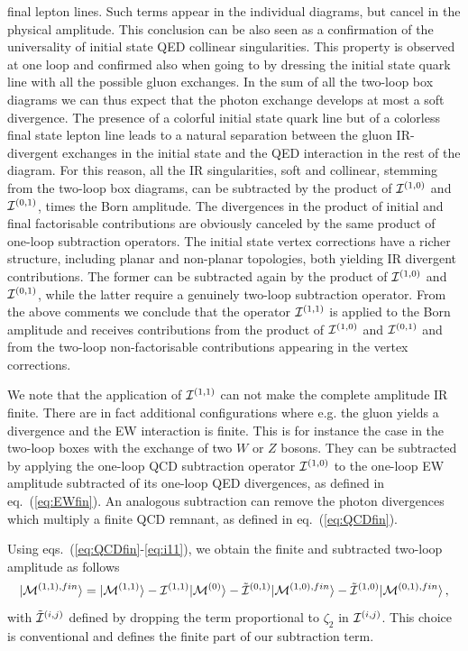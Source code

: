 \documentclass[11pt,a4paper]{article}
\begin{document}
  final lepton lines. Such terms appear in the individual diagrams, but cancel
  in the physical amplitude. This conclusion can be also seen as a confirmation
  of the universality of initial state QED collinear singularities.
  This property is observed at one loop and confirmed also when going to \oaas
  by dressing the initial state quark line with all the possible
  gluon exchanges. In the sum of all the two-loop box diagrams
  we can thus expect that the
  photon exchange develops at most a soft divergence.
  The presence of a colorful initial state quark line
  but of a colorless final state lepton line
  leads to a natural separation between the gluon IR-divergent
  exchanges in the initial state
  and the QED interaction in the rest of the diagram.
  For this reason, all the IR singularities,
  soft and collinear, stemming from the two-loop box diagrams, can be subtracted
  by the product of ${\cal I}^{(1,0)}$ and ${\cal I}^{(0,1)}$, times the Born amplitude.
  The divergences in the product of initial and final factorisable contributions
  are obviously canceled by the same product of one-loop subtraction operators.
  The initial state vertex corrections have a richer structure,
  including planar and non-planar topologies,
  both yielding IR divergent contributions.
  The former can be subtracted again by the product of
  ${\cal I}^{(1,0)}$ and ${\cal I}^{(0,1)}$,
  while the latter require a genuinely two-loop subtraction operator.
  From the above comments we conclude that the operator ${\cal I}^{(1,1)}$
  is applied to the Born amplitude and
  receives contributions from the product of ${\cal I}^{(1,0)}$ and ${\cal I}^{(0,1)}$
  and from the two-loop non-factorisable contributions appearing in the
  vertex corrections.

  We note that the application of ${\cal I}^{(1,1)}$ can not make the
  complete amplitude IR finite. There are in fact additional configurations
  where e.g. the gluon yields a divergence and the EW interaction is finite.
  This is for instance the case in the two-loop boxes with the exchange
  of two $W$ or $Z$ bosons.
  They can be subtracted by applying the one-loop QCD subtraction
  operator  ${\cal I}^{(1,0)}$ to the one-loop EW amplitude subtracted of its one-loop
  QED divergences, as defined in eq.~(\ref{eq:EWfin}).
  An analogous subtraction can remove the photon divergences which multiply
  a finite QCD remnant, as defined in eq.~(\ref{eq:QCDfin}).



Using eqs.~(\ref{eq:QCDfin}-\ref{eq:i11}), we obtain the finite and subtracted two-loop amplitude as follows
%
\begin{equation}
  | {\cal M}^{(1,1),fin} \rangle =
  | {\cal M}^{(1,1)} \rangle -  {\cal I}^{(1,1)} | {\cal M}^{(0)} \rangle
                      - \tilde{{\cal I}}^{(0,1)} | {\cal M}^{(1,0),fin} \rangle
                      - \tilde{{\cal I}}^{(1,0)} | {\cal M}^{(0,1),fin} \rangle \, ,
 \label{eq:subtracted}
\end{equation}
%
%
with $\tilde{{\cal I}}^{(i,j)}$  defined by dropping
the term proportional to $\zeta_2$ in ${{\cal I}}^{(i,j)}$.
This choice is conventional and defines the finite part of our subtraction term.
%
\end{document}

